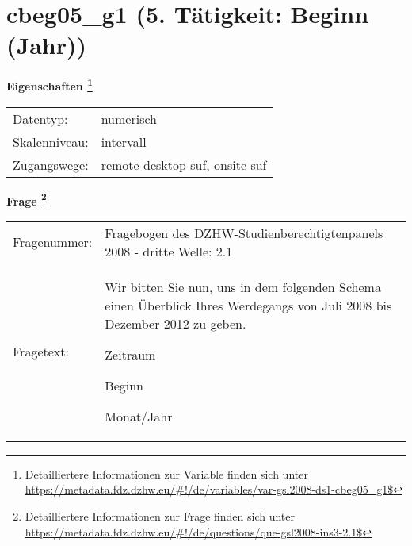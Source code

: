 
    \setcounter{footnote}{0}

    \vspace*{-1.8cm}
	\section{cbeg05\_g1 (5. Tätigkeit: Beginn (Jahr))}
	\label{section:cbeg05_g1}



    \vspace*{0.5cm}
    \noindent\textbf{Eigenschaften
	\footnote{Detailliertere Informationen zur Variable finden sich unter
		\url{https://metadata.fdz.dzhw.eu/\#!/de/variables/var-gsl2008-ds1-cbeg05_g1$}}}\\
	\begin{tabularx}{\hsize}{@{}lX}
	Datentyp: & numerisch \\
	Skalenniveau: & intervall \\
	Zugangswege: &
	  remote-desktop-suf, 
	  onsite-suf
 \\
    \end{tabularx}



				\vspace*{0.5cm}
                \noindent\textbf{Frage
	                \footnote{Detailliertere Informationen zur Frage finden sich unter
		              \url{https://metadata.fdz.dzhw.eu/\#!/de/questions/que-gsl2008-ins3-2.1$}}}\\
				\begin{tabularx}{\hsize}{@{}lX}
					Fragenummer: &
					  Fragebogen des DZHW-Studienberechtigtenpanels 2008 - dritte Welle:
					  2.1
 \\
					Fragetext: & Wir bitten Sie nun, uns in dem folgenden Schema einen Überblick Ihres Werdegangs von Juli 2008 bis Dezember 2012 zu geben.\par  Zeitraum\par  Beginn\par  Monat/Jahr \\
				\end{tabularx}






